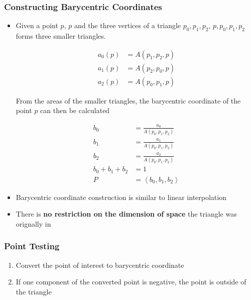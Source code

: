   \subsubsection{Constructing Barycentric Coordinates}

    \begin{itemize}
      \item Given a point $ p $, $ p $ and the three vertices of a triangle
      $ p_{0}, p_{1}, p_{2} $, $ p, p_{0}, p_{1}, p_{2} $ forms three
      smaller triangles.

      \begin{align}
        a_{0}\left( p \right) &= A\left( p_{1}, p_{2}, p \right) \\
        a_{1}\left( p \right) &= A\left( p_{2}, p_{0}, p \right) \\
        a_{2}\left( p \right) &= A\left( p_{0}, p_{1}, p \right)
      \end{align}

      From the areas of the smaller triangles, the barycentric coordinate
      of the point $ p $ can then be calculated

      \begin{align}
        b_{0} &= \frac{a_{0}}{A\left( p_{0}, p_{1}, p_{2} \right)} \\
        b_{1} &= \frac{a_{1}}{A\left( p_{0}, p_{1}, p_{2} \right)} \\
        b_{2} &= \frac{a_{2}}{A\left( p_{0}, p_{1}, p_{2} \right)} \\
        b_{0} + b_{1} + b_{2} &= 1 \\
        P &= \left< b_{0}, b_{1}, b_{2} \right>
      \end{align}

      \item Barycentric coordinate construction is similar to linear
      interpolation
      \item There is \textbf{no restriction on the dimension of space} the
      triangle was orignally in
    \end{itemize}

  \subsubsection{Point Testing}

    \begin{enumerate}
      \item Convert the point of interest to barycentric coordinate
      \item If one component of the converted point is negative, the point is
      outside of the triangle
    \end{enumerate}

